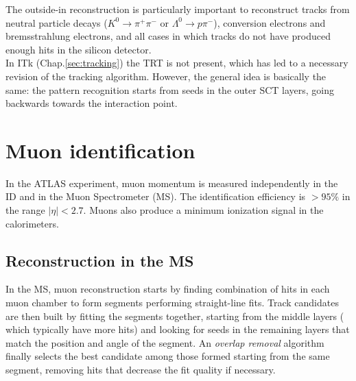 \documentclass[a4paper,twoside,12pt]{book}
\begin{document}
The outside-in reconstruction is particularly important to reconstruct tracks from neutral particle decays ($K^0 \rightarrow \pi^+\pi^-$ or $\Lambda^0 \rightarrow p\pi^-$), conversion
electrons and bremsstrahlung electrons, and all cases in which tracks do not have
produced enough hits in the silicon detector. \\

In ITk (Chap.\ref{sec:tracking}) the TRT is not present, which has led to a necessary revision of the tracking algorithm. However, the general idea is basically the same:
the pattern recognition starts from seeds in the outer SCT layers, going backwards towards the interaction point\cite{Claudia}.

\section{Muon identification}
In the ATLAS experiment, muon momentum is measured independently in the ID and in the
Muon Spectrometer (MS). The identification efficiency is \mbox{$> 95\%$\cite{PhysicsObjectReconstruction}} in the
range $|\eta| < 2.7$. Muons also produce a minimum ionization signal in the calorimeters.\\

\subsection*{Reconstruction in the MS}
In the MS, muon reconstruction starts by finding combination of hits in each muon chamber
to form segments performing straight-line fits. Track candidates are then built by fitting the
segments together\cite{muonReconstruction}, starting from the middle layers (
which typically have more hits) and looking for seeds in the remaining layers that match
the position and angle of the segment. An \textit{overlap removal} algorithm finally
selects the best candidate among those formed starting from the same segment, 
removing hits that decrease the fit quality if necessary.
\end{document}

